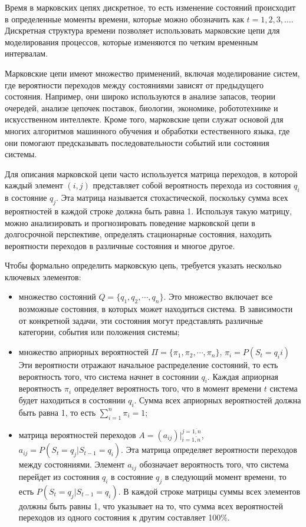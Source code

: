 Время в марковских цепях дискретное, то есть изменение состояний происходит в определенные моменты времени, которые можно обозначить как $t = 1, 2, 3, \ldots$. Дискретная структура времени позволяет использовать марковские цепи для моделирования процессов, которые изменяются по четким временным интервалам.

Марковские цепи имеют множество применений, включая моделирование систем, где вероятности переходов между состояниями зависят от предыдущего состояния. Например, они широко используются в анализе запасов, теории очередей, анализе цепочек поставок, биологии, экономике, робототехнике и искусственном интеллекте. Кроме того, марковские цепи служат основой для многих алгоритмов машинного обучения и обработки естественного языка, где они помогают предсказывать последовательности событий или состояния системы.

Для описания марковской цепи часто используется матрица переходов, в которой каждый элемент $(i, j)$ представляет собой вероятность перехода из состояния $q_i$ в состояние $q_j$. Эта матрица называется стохастической, поскольку сумма всех вероятностей в каждой строке должна быть равна 1. Используя такую матрицу, можно анализировать и прогнозировать поведение марковской цепи в долгосрочной перспективе, определять стационарные состояния, находить вероятности переходов в различные состояния и многое другое.

Чтобы формально определить марковскую цепь, требуется указать несколько ключевых элементов:

\begin{itemize}
	\item множество состояний $Q = \{q_1, q_2, \cdots, q_n\}$. Это множество включает все возможные состояния, в которых может находиться система. В зависимости от конкретной задачи, эти состояния могут представлять различные категории, события или положения системы;
	\item множество априорных вероятностей $\Pi = \{ \pi_1, \pi_2, \cdots, \pi_n \}$, $\pi_i = P(S_t = q_ii)$ Эти вероятности отражают начальное распределение состояний, то есть вероятность того, что система начнет в состоянии $q_i$. Каждая априорная вероятность $\pi_i$ определяет вероятность того, что в момент времени $t$ система будет находиться в состоянии $q_i$. Сумма всех априорных вероятностей должна быть равна 1, то есть $\sum_{i=1}^{n} \pi_i = 1$;
	\item матрица вероятностей переходов $A = \left(a_{ij}\right)|_{i=\overline{1,n}}^{j=\overline{1,n}}$, $a_{ij} = P(S_t = q_j | S_{t-1} = q_i)$. Эта матрица определяет вероятности переходов между состояниями. Элемент $a_{ij}$ обозначает вероятность того, что система перейдет из состояния $q_i$ в состояние $q_j$ в следующий момент времени, то есть $P(S_t = q_j | S_{t-1} = q_i)$. В каждой строке матрицы суммы всех элементов должны быть равны 1, что указывает на то, что сумма всех вероятностей переходов из одного состояния к другим составляет 100\%.
\end{itemize}

